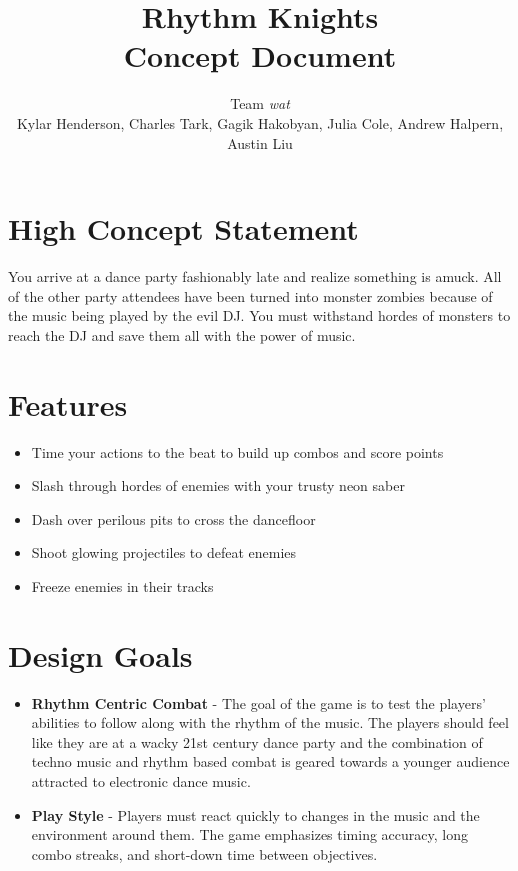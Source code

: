 \documentclass[]{article}
\begin{document}
\title{\textbf{Rhythm Knights} \\ Concept Document}
\author{Team \emph{wat} \\
\small{Kylar Henderson, Charles Tark, 
Gagik Hakobyan, Julia Cole, Andrew Halpern, Austin Liu}}
\date{} %
\maketitle

\section*{High Concept Statement}
You arrive at a dance party fashionably late and realize something is
amuck. All of the other party attendees have been turned into monster
zombies because of the music being played by the evil DJ. You must
withstand hordes of monsters to reach the DJ and save them all with
the power of music.

\section*{Features}
\begin{itemize}
\item Time your actions to the beat to build up combos and score points
\item Slash through hordes of enemies with your trusty neon saber
\item Dash over perilous pits to cross the dancefloor
\item Shoot glowing projectiles to defeat enemies
\item Freeze enemies in their tracks
\end{itemize}

\section*{Design Goals}
\begin{itemize}
\item
  \textbf{Rhythm Centric Combat} - The goal of the game is to test the
  players' abilities to follow along with the rhythm of the music. The
  players should feel like they are at a wacky 21st century dance party
  and the combination of techno music and rhythm based combat is geared
  towards a younger audience attracted to electronic dance music.
\item
  \textbf{Play Style} - Players must react quickly to changes in the
  music and the environment around them. The game emphasizes timing
  accuracy, long combo streaks, and short-down time between objectives.
\end{itemize}
\end{document}
